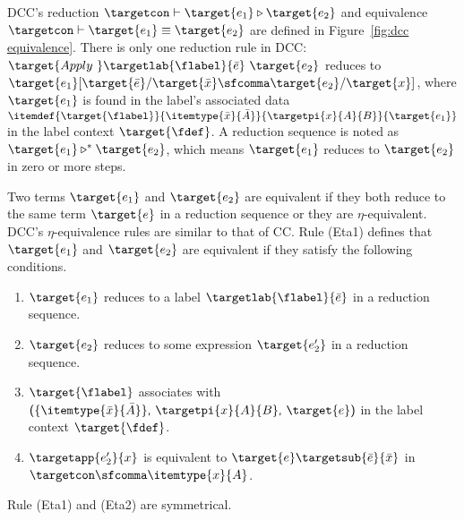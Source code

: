 DCC's reduction $\targetcon \vdash \target{e_1} \triangleright \target{e_2}$ and equivalence $\targetcon \vdash \target{e_1} \equiv \target{e_2}$ are defined in Figure~\ref{fig:dcc equivalence}. 
There is only one reduction rule in DCC: $\target{Apply\ } \targetlab{\flabel}{\bar{e}}\ \target{e_2}$
reduces to $\target{e_1}[\target{\bar{e}} \slash \target{\bar{x}} \sfcomma \target{e_2} \slash \target{x}]$, where $\target{e_1}$ is found in the label's associated data $\itemdef{\target{\flabel}}{\itemtype{\bar{x}}{\bar{A}}}{\targetpi{x}{A}{B}}{\target{e_1}}$ in the label context $\target{\fdef}$. A reduction sequence is noted as $\target{e_1} \triangleright^* \target{e_2}$, which means $\target{e_1}$ reduces to $\target{e_2}$ in zero or more steps.

Two terms $\target{e_1}$ and $\target{e_2}$ are equivalent if they both reduce to the same term $\target{e}$ in a reduction sequence or they are $\eta$-equivalent. DCC's $\eta$-equivalence rules are similar to that of CC. 
Rule (Eta1) defines that $\target{e_1}$ and $\target{e_2}$ are equivalent if they satisfy the following conditions.
\begin{enumerate}
	\item  $\target{e_1}$ reduces to a label $\targetlab{\flabel}{\bar{e}}$ in a reduction sequence.
	\item  $\target{e_2}$ reduces to some expression $\target{e_2'}$ in a reduction sequence.
	\item  $\target{\flabel}$ associates with 
	$\textsf{(}\{\itemtype{\bar{x}}{\bar{A}}\}\textsf{,}\ \targetpi{x}{A}{B} \textsf{,}\ \target{e} \textsf{)}$ 
	in the label context $\target{\fdef}$.
	\item  $\targetapp{e_2'}{x}$ is equivalent to $\target{e}\targetsub{\bar{e}}{\bar{x}}$ in $\targetcon\sfcomma\itemtype{x}{A}$.
\end{enumerate}
Rule (Eta1) and (Eta2) are symmetrical.







